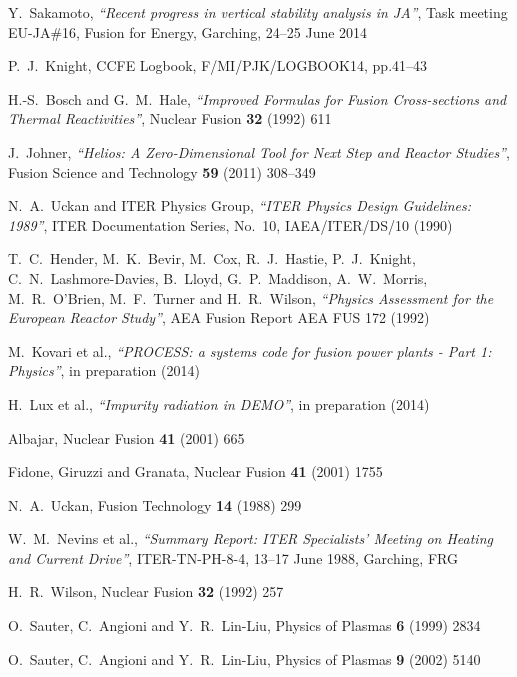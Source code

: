 \documentclass[11pt,a4paper]{report}
\begin{document}
\begin{thebibliography}{99}
Y.\ Sakamoto,
\textit{``Recent progress in vertical stability analysis in JA''},
Task meeting EU-JA\#16, Fusion for Energy, Garching, 24--25 June 2014

P.\ J.\ Knight, CCFE Logbook, F/MI/PJK/LOGBOOK14, pp.41--43

H.-S.\ Bosch and G.\ M.\ Hale,
\textit{``Improved Formulas for Fusion Cross-sections and Thermal Reactivities''},
Nuclear Fusion \textbf{32} (1992) 611

J.\ Johner,
\textit{``Helios: A Zero-Dimensional Tool for Next Step and Reactor Studies''},
Fusion Science and Technology \textbf{59} (2011) 308--349

N.\ A.\ Uckan and ITER Physics Group,
\textit{``ITER Physics Design Guidelines: 1989''},
ITER Documentation Series, No.\ 10, IAEA/ITER/DS/10
(1990)

T.\ C.\ Hender, M.\ K.\ Bevir, M.\ Cox, R.\ J.\ Hastie, P.\ J.\
Knight, C.\ N.\ Lashmore-Davies, B.\ Lloyd, G.\ P.\ Maddison, A.\ W.\
Morris, M.\ R.\ O'Brien, M.\ F.\ Turner and H.\ R.\ Wilson,
\textit{``Physics Assessment for the European Reactor Study''},
AEA Fusion Report AEA FUS 172
(1992)

M.\ Kovari et al.,
\textit{``PROCESS: a systems code for fusion power plants - Part 1: Physics''},
in preparation (2014)

H.\ Lux et al.,
\textit{``Impurity radiation in DEMO''},
in preparation (2014)

Albajar,
Nuclear Fusion \textbf{41} (2001) 665

Fidone, Giruzzi and Granata,
Nuclear Fusion \textbf{41} (2001) 1755

N.\ A.\ Uckan,
Fusion Technology \textbf{14} (1988) 299

W.\ M.\ Nevins et al.,
\textit{``Summary Report: ITER Specialists' Meeting on Heating and
Current Drive''},
ITER-TN-PH-8-4,
13--17 June 1988, Garching, FRG

H.\ R.\ Wilson,
Nuclear Fusion \textbf{32} (1992) 257

O.\ Sauter, C.\ Angioni and Y.\ R.\ Lin-Liu,
Physics of Plasmas \textbf{6} (1999) 2834

O.\ Sauter, C.\ Angioni and Y.\ R.\ Lin-Liu,
Physics of Plasmas \textbf{9} (2002) 5140


\end{thebibliography}
\end{document}
